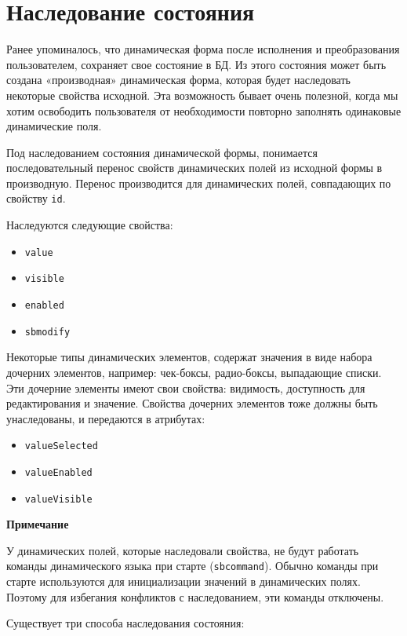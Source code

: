 \documentclass[../index.tex]{subfiles}
\begin{document}
\section{Наследование состояния}
Ранее упоминалось, что динамическая форма после исполнения и преобразования пользователем,
сохраняет свое состояние в БД. Из этого состояния может быть создана «производная» динамическая форма,
которая будет наследовать некоторые свойства исходной. Эта возможность бывает очень полезной,
когда мы хотим освободить пользователя от необходимости повторно заполнять одинаковые динамические поля.

Под наследованием состояния динамической формы, понимается последовательный перенос свойств динамических полей
из исходной формы в производную. Перенос производится для динамических полей, совпадающих по свойству \verb|id|.


Наследуются следующие свойства:
\begin{itemize}
    \item \verb|value|
    \item \verb|visible|
    \item \verb|enabled|
    \item \verb|sbmodify|
\end{itemize}
\vspace{5mm}


Некоторые типы динамических элементов, содержат значения в виде набора дочерних элементов,
например: чек-боксы, радио-боксы, выпадающие списки. Эти дочерние элементы имеют свои
свойства: видимость, доступность для редактирования и значение.
Свойства дочерних элементов тоже должны быть унаследованы, и передаются в
атрибутах:
\begin{itemize}
  \item \verb|valueSelected|
  \item \verb|valueEnabled|
  \item \verb|valueVisible|
\end{itemize}
\vspace{5mm}


\textbf{Примечание}


У динамических полей, которые наследовали свойства,
не будут работать команды динамического языка при старте (\verb|sbcommand|).
Обычно команды при старте используются для инициализации значений в динамических полях.
Поэтому для избегания конфликтов с наследованием, эти команды отключены.


Существует три способа наследования состояния:
\end{document}
